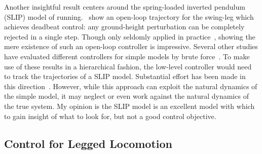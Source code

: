 Another insightful result centers around the spring-loaded inverted pendulum (SLIP) model of running.~\textcite{wu20133} show an open-loop trajectory for the swing-leg which achieves deadbeat control: any ground-height perturbation can be completely rejected in a single step. Though only seldomly applied in practice~\cite{martin2017experimental}, showing the mere existence of such an open-loop controller is impressive.
Several other studies have evaluated different controllers for simple models by brute force~\cite{piovan2013two,cnops2015basin,piovan2015reachability}.
To make use of these results in a hierarchical fashion, the low-level controller would need to track the trajectories of a SLIP model. Substantial effort has been made in this direction~\cite{hutter2010slip, wensing2013high,poulakakis2009spring, renjewski2015exciting, martin2017experimental}. However, while this approach can exploit the natural dynamics of the simple model, it may neglect or even work against the natural dynamics of the true system. My opinion is the SLIP model is an excellent model with which to gain insight of what to look for, but not a good control objective. \par



\subsection{Control for Legged Locomotion}



